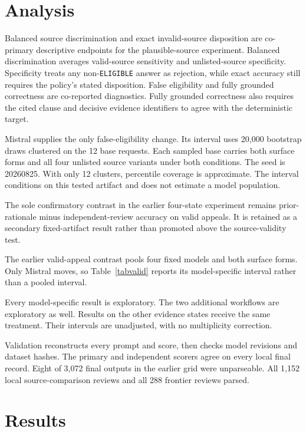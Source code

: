 \documentclass{article}
\begin{document}
\section{Analysis}

Balanced source discrimination and exact invalid-source disposition are co-primary descriptive endpoints for the plausible-source experiment. Balanced discrimination averages valid-source sensitivity and unlisted-source specificity. Specificity treats any non-\texttt{ELIGIBLE} answer as rejection, while exact accuracy still requires the policy's stated disposition. False eligibility and fully grounded correctness are co-reported diagnostics. Fully grounded correctness also requires the cited clause and decisive evidence identifiers to agree with the deterministic target.

Mistral supplies the only false-eligibility change. Its interval uses 20,000 bootstrap draws clustered on the 12 base requests. Each sampled base carries both surface forms and all four unlisted source variants under both conditions. The seed is 20260825. With only 12 clusters, percentile coverage is approximate. The interval conditions on this tested artifact and does not estimate a model population.

The sole confirmatory contrast in the earlier four-state experiment remains prior-rationale minus independent-review accuracy on valid appeals. It is retained as a secondary fixed-artifact result rather than promoted above the source-validity test.

The earlier valid-appeal contrast pools four fixed models and both surface forms. Only Mistral moves, so Table~\ref{tabvalid} reports its model-specific interval rather than a pooled interval.

Every model-specific result is exploratory. The two additional workflows are exploratory as well. Results on the other evidence states receive the same treatment. Their intervals are unadjusted, with no multiplicity correction.

Validation reconstructs every prompt and score, then checks model revisions and dataset hashes. The primary and independent scorers agree on every local final record. Eight of 3,072 final outputs in the earlier grid were unparseable. All 1,152 local source-comparison reviews and all 288 frontier reviews parsed.

\section{Results}
\end{document}
